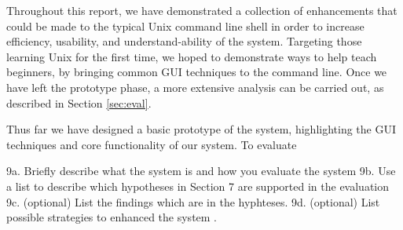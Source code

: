 Throughout this report, we have demonstrated a collection of enhancements that
could be made to the typical Unix command line shell in order to increase
efficiency, usability, and understand-ability of the system. Targeting those
learning Unix for the first time, we hoped to demonstrate ways to help teach
beginners, by bringing common GUI techniques to the command line. Once we have
left the prototype phase, a more extensive analysis can be carried out, as
described in Section \ref{sec:eval}.

Thus far we have designed a basic prototype of the system, highlighting the
GUI techniques and core functionality of our system. To evaluate

9a. Briefly describe what the system is and how you evaluate the system
9b. Use a list to describe which hypotheses in Section 7 are supported in the evaluation
9c. (optional) List the findings which are in the hyphteses.
9d. (optional) List possible strategies to enhanced the system
.
